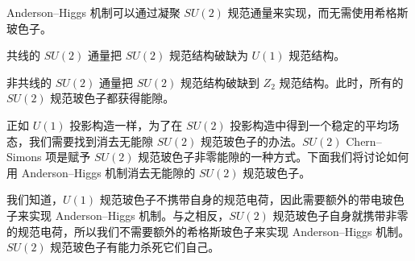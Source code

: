 \begin{keypoints}
\item Anderson--Higgs 机制可以通过凝聚 $SU(2)$ 规范通量来实现，而无需使用希格斯玻色子。
\item 共线的 $SU(2)$ 通量把 $SU(2)$ 规范结构破缺为 $U(1)$ 规范结构。

\item 非共线的 $SU(2)$ 通量把 $SU(2)$ 规范结构破缺到 $Z_2$ 规范结构。此时，所有的 $SU(2)$ 规范玻色子都获得能隙。
\end{keypoints}

正如 $U(1)$ 投影构造一样，为了在 $SU(2)$ 投影构造中得到一个稳定的平均场态，我们需要找到消去无能隙 $SU(2)$ 规范玻色子的办法。$SU(2)$ Chern--Simons 项是赋予 $SU(2)$ 规范玻色子非零能隙的一种方式。下面我们将讨论如何用 Anderson--Higgs 机制消去无能隙的 $SU(2)$ 规范玻色子。

我们知道，$U(1)$ 规范玻色子不携带自身的规范电荷，因此需要额外的带电玻色子来实现 Anderson--Higgs 机制。与之相反，$SU(2)$ 规范玻色子自身就携带非零的规范电荷，所以我们不需要额外的希格斯玻色子来实现 Anderson--\allowbreak Higgs 机制。$SU(2)$ 规范玻色子有能力杀死它们自己。

